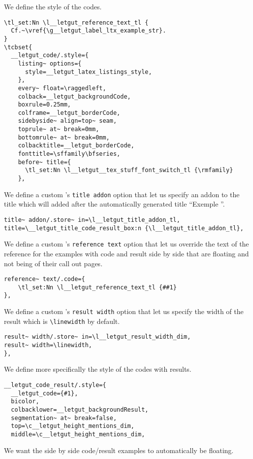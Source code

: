 \documentclass{letgut}
\begin{document}
We define the style of the codes.

\begin{lstlisting}
\tl_set:Nn \l__letgut_reference_text_tl {
  Cf.~\vref{\g__letgut_label_ltx_example_str}.
}
\tcbset{
  __letgut_code/.style={
    listing~ options={
      style=__letgut_latex_listings_style,
    },
    every~ float=\raggedleft,
    colback=__letgut_backgroundCode,
    boxrule=0.25mm,
    colframe=__letgut_borderCode,
    sidebyside~ align=top~ seam,
    toprule~ at~ break=0mm,
    bottomrule~ at~ break=0mm,
    colbacktitle=__letgut_borderCode,
    fonttitle=\sffamily\bfseries,
    before~ title={
      \tl_set:Nn \l__letgut__tex_stuff_font_switch_tl {\rmfamily}
    },
\end{lstlisting}
We define a custom 's \lstinline+title addon+ option that let us
specify an addon to the title which will added after the automatically
generated title “Exemple ”.
\begin{lstlisting}
title~ addon/.store~ in=\l__letgut_title_addon_tl,
title=\__letgut_title_code_result_box:n {\l__letgut_title_addon_tl},
\end{lstlisting}
We define a custom 's \lstinline+reference text+ option that let us
override the text of the reference for the examples with code and result side by
side that are floating and not being of their call out pages.
\begin{lstlisting}
reference~ text/.code={
    \tl_set:Nn \l__letgut_reference_text_tl {##1}
},
\end{lstlisting}
We define a custom 's \lstinline+result width+ option that let us
specify the width of the result which is \lstinline+\linewidth+ by default.
\begin{lstlisting}
result~ width/.store~ in=\l__letgut_result_width_dim,
result~ width=\linewidth,
},
\end{lstlisting}
We define more specifically the style of the codes with results.
\begin{lstlisting}
__letgut_code_result/.style={
  __letgut_code={#1},
  bicolor,
  colbacklower=__letgut_backgroundResult,
  segmentation~ at~ break=false,
  top=\c__letgut_height_mentions_dim,
  middle=\c__letgut_height_mentions_dim,
\end{lstlisting}
We want the side by side code/result examples to automatically be floating.
\end{document}
